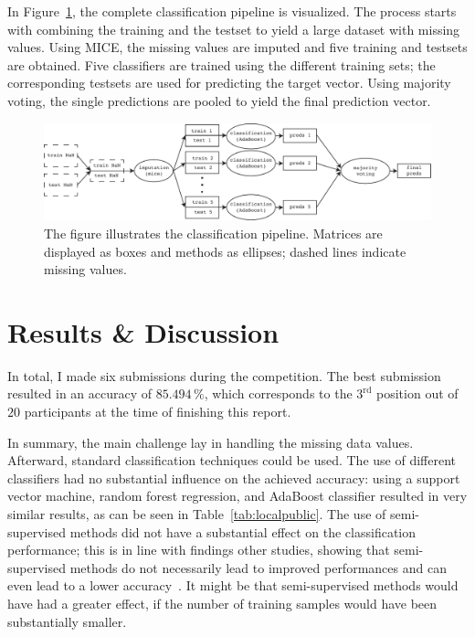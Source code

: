 \documentclass{article}
\begin{document}
In Figure~\ref{fig:pipeline}, the complete classification pipeline is visualized. The process starts with combining the training and the testset to yield a large dataset with missing values. Using MICE, the missing values are imputed and five training and testsets are obtained. Five classifiers are trained using the different training sets; the corresponding testsets are used for predicting the target vector. Using majority voting, the single predictions are pooled to yield the final prediction vector.

\begin{figure}[h!]
\begin{center}
\includegraphics[width=1\columnwidth]{figures/fig_pipeline/pipeline}
\caption{{\label{fig:pipeline} The figure illustrates the classification pipeline. Matrices are displayed as boxes and methods as ellipses; dashed lines indicate missing values.%
}}
\end{center}
\end{figure}

\section{Results \& Discussion}
\label{sec:results}

In total, I made six submissions during the competition. The best
submission resulted in an accuracy of $85.494\,\%$, which corresponds to
the $3^{\text{rd}}$ position out of $20$ participants at the time of finishing this report.

In summary, the main challenge lay in handling the missing data values.  Afterward, standard classification techniques could be used. The use of different classifiers had no substantial influence on the achieved accuracy: using a support vector machine, random forest regression, and AdaBoost
classifier resulted in very similar results, as can be seen in Table~\ref{tab:localpublic}. The use of semi-supervised methods did not have a substantial effect on the classification performance; this is in line with findings other studies, showing that semi-supervised methods do not necessarily lead to improved performances and can even lead to a lower accuracy~\cite{zhu2005semi}. It might be that semi-supervised methods would have had a greater effect, if the number of training samples would have been substantially smaller. 
\end{document}
